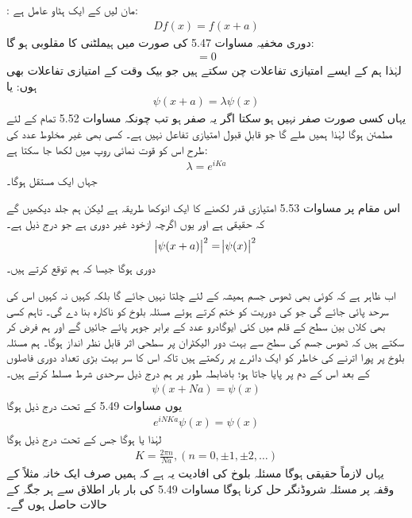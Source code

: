 : مان لیں کے  ایک ہٹاو عامل ہے:
\begin{align}
	Df(x) = f(x+a)
\end{align}
دوری مخفیہ مساوات \num{5.47} کی صورت میں  ہیملٹنی کا  مقلوبی  ہو گا:
\begin{align}
	[D, H] = 0
\end{align}
لہٰذا ہم  کے ایسے امتیازی تفاعلات چن سکتے ہیں جو بیک وقت  کے امتیازی تفاعلات بھی ہوں: یا
\begin{align}
	\psi(x+a) = \lambda\psi(x)
\end{align}
یہاں  کسی صورت صفر نہیں ہو سکتا اگر یہ صفر ہو تب چونکہ مساوات \num{5.52} تمام  کے لئے مطمئن ہوگا لہٰذا ہمیں  ملے گا جو قابلِ قبول امتیازی تفاعل نہیں ہے۔ کسی بھی غیر مخلوط عدد کی طرح اس کو قوت نمائی روپ میں لکھا جا سکتا ہے: 
\begin{align}
	\lambda = e^{iKa}
\end{align}
جہاں  ایک مستقل ہوگا۔

اس مقام پر مساوات \num{5.53} امتیازی قدر  لکھنے کا ایک انوکھا طریقہ ہے لیکن ہم جلد دیکھیں گے کہ  حقیقی ہے اور یوں اگرچہ  ازخود غیر دوری ہے جو درج ذیل ہے۔
\begin{align}
	\abs{\psi(x+a)}^{2} = \abs{\psi(x)}^{2}
\end{align}
دوری ہوگا جیسا کہ ہم توقع کرتے ہیں۔


اب ظاہر ہے کہ کوئی بھی   ٹھوس جسم ہمیشہ کے لئے چلتا نہیں جائے گا بلکہ کہیں نہ کہیں اس کی سرحد پائی جائے گی جو  کی دوریت کو ختم کرتے ہوئے مسئلہ بلوخ کو ناکارہ بنا دے گی۔ تاہم کسی بھی کلاں بین سطح کے  قلم میں کئی ایوگادرو عدد کے برابر جوہر پائے جائیں گے اور ہم فرض کر سکتے ہیں کہ ٹھوس جسم کی سطح سے بہت دور الیکٹران پر سطحی اثر قابل نظر انداز ہوگا۔ ہم مسئلہ بلوخ پر پورا اترنے کی خاطر  کو ایک دائرے پر رکھتے ہیں تاکہ اس کا سر  بہت بڑی تعداد  دوری فاصلوں کے بعد اس کے دم  پر پایا جاتا ہو؛  باضابطہ طور پر ہم درج ذیل سرحدی شرط مسلط کرتے ہیں۔   
\begin{align}
	\psi(x+Na) = \psi(x)
\end{align}
یوں مساوات \num{5.49} کے تحت درج ذیل ہوگا
\begin{align*}
	e^{iNKa}\psi(x) = \psi(x)
\end{align*}
لہٰذا  یا  ہوگا جس کے تحت درج ذیل ہوگا 
\begin{align}
	K = \frac{2\pi n}{Na}, (n = 0, \pm1, \pm2, \dots)
\end{align}
یہاں  لازماً حقیقی ہوگا مسئلہ بلوخ کی افادیت یہ ہے کہ ہمیں صرف ایک خانہ مثلاً  کے وقفہ پر مسئلہ شروڈنگر حل کرنا ہوگا مساوات \num{5.49} کی بار بار اطلاق سے ہر جگہ کے حالات  حاصل ہوں گے۔

